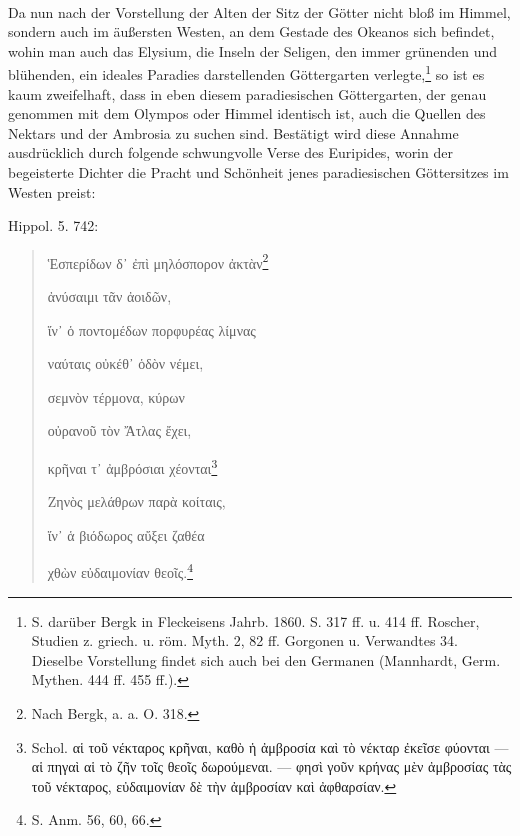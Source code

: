\documentclass[a4paper, 11pt, oneside]{article}
\begin{document}
\paragraph{}
Da nun nach der Vorstellung der Alten der Sitz der Götter nicht bloß im Himmel, sondern auch im äußersten Westen, an dem Gestade des Okeanos sich befindet, wohin man auch das Elysium, die Inseln der Seligen, den immer grünenden und blühenden, ein ideales Paradies darstellenden Göttergarten verlegte,\footnote{S. darüber Bergk in Fleckeisens Jahrb. 1860. S. 317 ff. u. 414 ff. Roscher, Studien z. griech. u. röm. Myth. 2, 82 ff. Gorgonen u. Verwandtes 34. Dieselbe Vorstellung findet sich auch bei den Germanen (Mannhardt, Germ. Mythen. 444 ff. 455 ff.).} so ist es kaum zweifelhaft, dass in eben diesem paradiesischen Göttergarten, der genau genommen mit dem Olympos oder Himmel identisch ist, auch die Quellen des Nektars und der Ambrosia zu suchen sind. Bestätigt wird diese Annahme ausdrücklich durch folgende schwungvolle Verse des Euripides, worin der begeisterte Dichter die Pracht und Schönheit jenes paradiesischen Göttersitzes im Westen preist:

Hippol. 5. 742:
\begin{quotation}
Ἑσπερίδων δ᾽ ἐπὶ μηλόσπορον ἀκτὰν\footnote{Nach Bergk, a. a. O. 318.}

ἀνύσαιμι τᾶν ἀοιδῶν,

ἵν᾿ ὁ ποντομέδων πορφυρέας λίμνας

ναύταις οὐκέθ᾽ ὁδὸν νέμει,

σεμνὸν τέρμονα, κύρων

οὐρανοῦ τὸν Ἄτλας ἔχει,

κρῆναι τ᾽ ἀμβρόσιαι χέονται\footnote{Schol. αἱ τοῦ νέκταρος κρῆναι, καθὸ ἡ ἀμβροσία καὶ τὸ νέκταρ ἐκεῖσε φύονται --- αἱ πηγαὶ αἱ τὸ ζῆν τοῖς θεοῖς δωρούμεναι. --- φησὶ γοῦν κρήνας μὲν ἀμβροσίας τὰς τοῦ νέκταρος, εὐδαιμονίαν δὲ τὴν ἀμβροσίαν καὶ ἀφθαρσίαν.}

Ζηνὸς μελάθρων παρὰ κοίταις,

ἵν᾽ ἁ βιόδωρος αὔξει ζαθέα

χθὼν εὐδαιμονίαν θεοῖς.\footnote{S. Anm. 56, 60, 66.}
\end{quotation}
\end{document}
